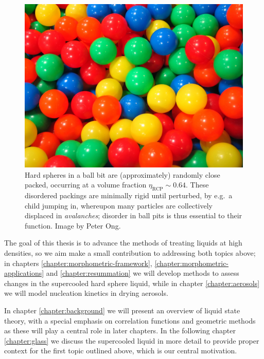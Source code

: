 \documentclass[11pt,twoside]{report}
\begin{document}
\begin{figure}
  \includegraphics[width=0.75\linewidth,outer]{ball-pit-horizontal}
  \caption[Random close packing in a ball pit]{
    Hard spheres in a ball bit are (approximately) randomly close packed, occurring at a volume fraction $\eta_\mathrm{RCP} \sim 0.64$.
    These disordered packings are minimally rigid until perturbed, by e.g.\ a child jumping in, whereupon many particles are collectively displaced in \emph{avalanches}; disorder in ball pits is thus essential to their function.
    Image by Peter Ong.}
  \label{fig:rcp}
\end{figure}

The goal of this thesis is to advance the methods of treating liquids at high densities, so we aim make a small contribution to addressing both topics above; in chapters \ref{chapter:morphometric-framework}, \ref{chapter:morphometric-applications} and \ref{chapter:resummation} we will develop methods to assess changes in the supercooled hard sphere liquid, while in chapter \ref{chapter:aerosols} we will model nucleation kinetics in drying aerosols.


In chapter \ref{chapter:background} we will present an overview of liquid state theory, with a special emphasis on correlation functions and geometric methods as these will play a central role in later chapters.
In the following chapter \ref{chapter:glass} we discuss the supercooled liquid in more detail to provide proper context for the first topic outlined above, which is our central motivation.
\end{document}
